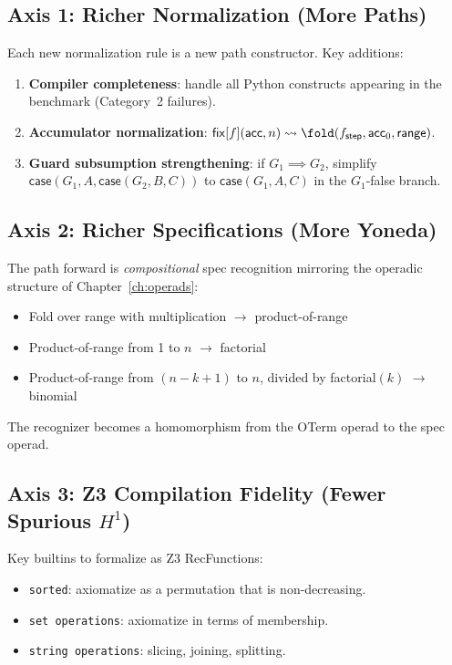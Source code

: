 \subsection{Axis 1: Richer Normalization (More Paths)}

Each new normalization rule is a new path constructor.
Key additions:
\begin{enumerate}
  \item \textbf{Compiler completeness}: handle all Python
    constructs appearing in the benchmark (Category~2 failures).
  \item \textbf{Accumulator normalization}:
    $\mathsf{fix}[f](\mathsf{acc}, n) \leadsto
    \fold(f_{\mathsf{step}}, \mathsf{acc}_0, \mathsf{range})$.
  \item \textbf{Guard subsumption strengthening}: if
    $G_1 \implies G_2$, simplify
    $\mathsf{case}(G_1, A, \mathsf{case}(G_2, B, C))$ to
    $\mathsf{case}(G_1, A, C)$ in the $G_1$-false branch.
\end{enumerate}

\subsection{Axis 2: Richer Specifications (More Yoneda)}

The path forward is \emph{compositional} spec recognition
mirroring the operadic structure of Chapter~\ref{ch:operads}:
\begin{itemize}
  \item Fold over range with multiplication $\to$
    product-of-range
  \item Product-of-range from 1 to $n$ $\to$ factorial
  \item Product-of-range from $(n-k+1)$ to $n$, divided by
    factorial$(k)$ $\to$ binomial
\end{itemize}
The recognizer becomes a homomorphism from the OTerm operad to
the spec operad.

\subsection{Axis 3: Z3 Compilation Fidelity (Fewer Spurious $H^1$)}

Key builtins to formalize as Z3 RecFunctions:
\begin{itemize}
  \item \texttt{sorted}: axiomatize as a permutation that is
    non-decreasing.
  \item \texttt{set operations}: axiomatize in terms of membership.
  \item \texttt{string operations}: slicing, joining, splitting.
\end{itemize}

